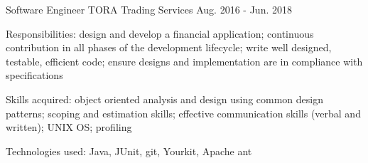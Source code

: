 \begin{cventries}
  \cventry
    {Software Engineer} %
    {TORA Trading Services} %
    {} %
    {Aug. 2016 - Jun. 2018} %
    {
      \begin{cvitems} %
        \item {Responsibilities: design and develop a financial application; continuous contribution in all phases of the development lifecycle; write well designed, testable, efficient code; ensure designs and implementation are in compliance with specifications}
        \item {Skills acquired: object oriented analysis and design using common design patterns; scoping and estimation skills; effective communication skills (verbal and written); UNIX OS; profiling}
        \item {Technologies used: Java, JUnit, git, Yourkit, Apache ant}
      \end{cvitems}
    }
\end{cventries}
